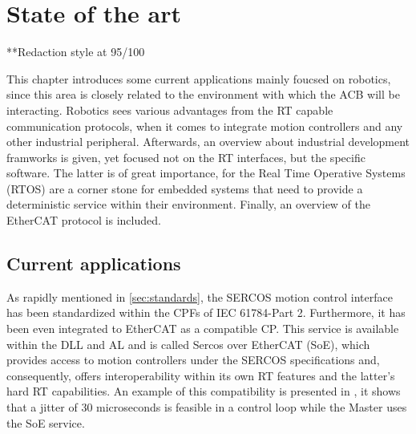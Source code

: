 \chapter{State of the art}\label{cha:state}
**Redaction style at 95/100

%
%  
%

This chapter introduces some current applications mainly foucsed on robotics, since this area is closely
related to the environment with which the ACB will be interacting. Robotics sees various advantages
from the RT capable communication protocols, when it comes to integrate motion controllers and 
any other industrial peripheral. Afterwards, an overview about industrial development framworks is 
given, yet focused not on the RT interfaces, but the specific software. The latter is of great importance,
for the Real Time Operative Systems (RTOS) are a corner stone for embedded systems that need to provide a 
deterministic service within their environment. Finally, an overview of the EtherCAT protocol is included.


\section{Current applications}\label{sec:applications}

As rapidly mentioned in \ref{sec:standards}, the SERCOS motion control interface has been standardized within the 
CPFs of IEC 61784-Part 2. Furthermore, it has been even integrated to EtherCAT as a compatible CP. 
This service is available within the DLL and AL and is called Sercos over EtherCAT (SoE), which provides access to motion controllers under 
the SERCOS specifications and, consequently, offers interoperability within its own RT features and the latter's hard RT capabilities.  
An example of this compatibility is presented in \cite{ecat_sercos}, %
it shows that a jitter of 30 microseconds is feasible in a control loop while the Master uses the SoE service.

